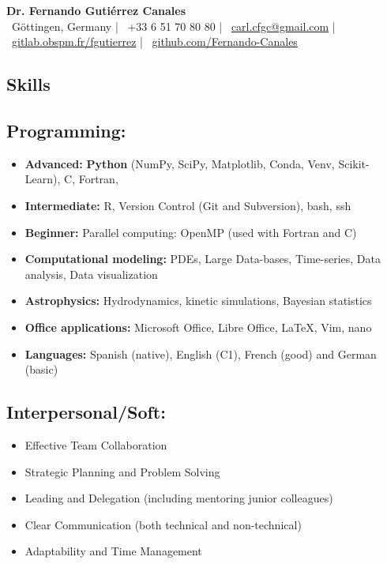 \documentclass[11pt,a4paper]{article}
\begin{document}
\begin{center}
  {\Huge\bfseries Dr. Fernando Guti\'errez Canales}\\[8pt]
  \faMapMarker*~Göttingen, Germany \quad | \quad
  \faPhone~+33 6 51 70 80 80 \quad | \quad
  \faEnvelope~\href{mailto:carl.cfgc@gmail.com}{carl.cfgc@gmail.com} \quad | \quad
  \faGitlab~\href{https://gitlab.obspm.fr/fgutierrez}{gitlab.obspm.fr/fgutierrez} \quad | \quad
  \faGithub~\href{https://github.com/Fernando-Canales}{github.com/Fernando-Canales}
\end{center}
	
	\vspace{10pt}
	
	\begin{multicols}{2}
		
		\section{Skills}
		
		\subsection{Programming:}
		\begin{itemize}
			\item \textbf{Advanced:} \textbf{Python} (NumPy, SciPy, Matplotlib, Conda, Venv, Scikit-Learn), C, Fortran,
			\item \textbf{Intermediate:} R, Version Control (Git and Subversion), bash, ssh
			\item \textbf{Beginner:} Parallel computing: OpenMP (used with Fortran and C)
			\item \textbf{Computational modeling:} PDEs, Large Data-bases, Time-series, Data analysis, Data visualization
			\item \textbf{Astrophysics:} Hydrodynamics, kinetic simulations, Bayesian statistics
			\item \textbf{Office applications:} Microsoft Office, Libre Office, \LaTeX , Vim, nano
			\item \textbf{Languages:} Spanish (native), English (C1), French (good) and German (basic)
		\end{itemize}
		
		\subsection{Interpersonal/Soft:}
		
		\begin{itemize}
			\item Effective Team Collaboration
			\item Strategic Planning and Problem Solving
			\item Leading and Delegation (including mentoring junior colleagues)
			\item Clear Communication (both technical and non-technical)
			\item Adaptability and Time Management
		\end{itemize}
		

\end{multicols}
\end{document}
